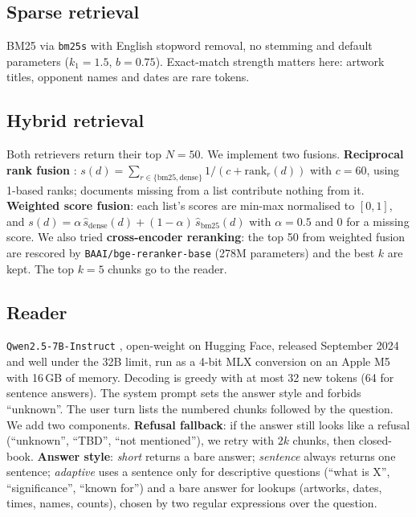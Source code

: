 \documentclass[11pt]{article}
\begin{document}
\subsection{Sparse retrieval}

BM25 \citep{robertson2009bm25} via \texttt{bm25s} \citep{bm25s} with English stopword removal, no stemming and default parameters ($k_1{=}1.5$, $b{=}0.75$). Exact-match strength matters here: artwork titles, opponent names and dates are rare tokens.

\subsection{Hybrid retrieval}

Both retrievers return their top $N{=}50$. We implement two fusions.
\textbf{Reciprocal rank fusion} \citep{cormack2009rrf}: $s(d)=\sum_{r\in\{\text{bm25},\text{dense}\}} 1/(c+\text{rank}_r(d))$ with $c{=}60$, using 1-based ranks; documents missing from a list contribute nothing from it.
\textbf{Weighted score fusion}: each list's scores are min-max normalised to $[0,1]$, and $s(d)=\alpha\,\hat{s}_{\text{dense}}(d)+(1-\alpha)\,\hat{s}_{\text{bm25}}(d)$ with $\alpha{=}0.5$ and 0 for a missing score.
We also tried \textbf{cross-encoder reranking}: the top 50 from weighted fusion are rescored by \texttt{BAAI/bge-reranker-base} \citep{xiao2023cpack} (278M parameters) and the best $k$ are kept. The top $k{=}5$ chunks go to the reader.

\subsection{Reader}

\texttt{Qwen2.5-7B-Instruct} \citep{qwen2025qwen25}, open-weight on Hugging Face, released September 2024 and well under the 32B limit, run as a 4-bit MLX conversion \citep{mlx2023} on an Apple M5 with 16\,GB of memory. Decoding is greedy with at most 32 new tokens (64 for sentence answers). The system prompt sets the answer style and forbids ``unknown''. The user turn lists the numbered chunks followed by the question.
We add two components.
\textbf{Refusal fallback}: if the answer still looks like a refusal (``unknown'', ``TBD'', ``not mentioned''), we retry with $2k$ chunks, then closed-book.
\textbf{Answer style}: \emph{short} returns a bare answer; \emph{sentence} always returns one sentence; \emph{adaptive} uses a sentence only for descriptive questions (``what is X'', ``significance'', ``known for'') and a bare answer for lookups (artworks, dates, times, names, counts), chosen by two regular expressions over the question.
\end{document}
